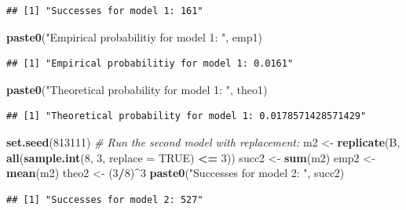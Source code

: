 \documentclass[
]{article}
\newenvironment{Shaded}{\begin{snugshade}}{\end{snugshade}}
\newcommand{\AttributeTok}[1]{\textcolor[rgb]{0.13,0.29,0.53}{#1}}
\newcommand{\CommentTok}[1]{\textcolor[rgb]{0.56,0.35,0.01}{\textit{#1}}}
\newcommand{\ConstantTok}[1]{\textcolor[rgb]{0.56,0.35,0.01}{#1}}
\newcommand{\DecValTok}[1]{\textcolor[rgb]{0.00,0.00,0.81}{#1}}
\newcommand{\FunctionTok}[1]{\textcolor[rgb]{0.13,0.29,0.53}{\textbf{#1}}}
\newcommand{\NormalTok}[1]{#1}
\newcommand{\OtherTok}[1]{\textcolor[rgb]{0.56,0.35,0.01}{#1}}
\newcommand{\SpecialCharTok}[1]{\textcolor[rgb]{0.81,0.36,0.00}{\textbf{#1}}}
\newcommand{\StringTok}[1]{\textcolor[rgb]{0.31,0.60,0.02}{#1}}
\begin{document}
\begin{verbatim}
## [1] "Successes for model 1: 161"
\end{verbatim}

\begin{Shaded}
\begin{Highlighting}[]
\FunctionTok{paste0}\NormalTok{(}\StringTok{"Empirical probabilitiy for model 1: "}\NormalTok{, emp1)}
\end{Highlighting}
\end{Shaded}

\begin{verbatim}
## [1] "Empirical probabilitiy for model 1: 0.0161"
\end{verbatim}

\begin{Shaded}
\begin{Highlighting}[]
\FunctionTok{paste0}\NormalTok{(}\StringTok{"Theoretical probability for model 1: "}\NormalTok{, theo1)}
\end{Highlighting}
\end{Shaded}

\begin{verbatim}
## [1] "Theoretical probability for model 1: 0.0178571428571429"
\end{verbatim}

\begin{Shaded}
\begin{Highlighting}[]
\FunctionTok{set.seed}\NormalTok{(}\DecValTok{813111}\NormalTok{)}
\CommentTok{\# Run the second model with replacement:}
\NormalTok{m2 }\OtherTok{\textless{}{-}} \FunctionTok{replicate}\NormalTok{(B, }\FunctionTok{all}\NormalTok{(}\FunctionTok{sample.int}\NormalTok{(}\DecValTok{8}\NormalTok{, }\DecValTok{3}\NormalTok{, }\AttributeTok{replace =} \ConstantTok{TRUE}\NormalTok{) }\SpecialCharTok{\textless{}=} \DecValTok{3}\NormalTok{))}
\NormalTok{succ2 }\OtherTok{\textless{}{-}} \FunctionTok{sum}\NormalTok{(m2)}
\NormalTok{emp2  }\OtherTok{\textless{}{-}} \FunctionTok{mean}\NormalTok{(m2)}
\NormalTok{theo2 }\OtherTok{\textless{}{-}}\NormalTok{ (}\DecValTok{3}\SpecialCharTok{/}\DecValTok{8}\NormalTok{)}\SpecialCharTok{\^{}}\DecValTok{3}
\FunctionTok{paste0}\NormalTok{(}\StringTok{"Successes for model 2: "}\NormalTok{, succ2)}
\end{Highlighting}
\end{Shaded}

\begin{verbatim}
## [1] "Successes for model 2: 527"
\end{verbatim}
\end{document}

